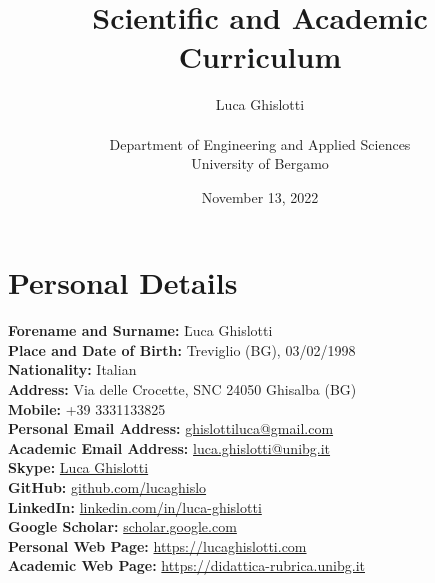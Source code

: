 \documentclass[11pt]{article}
\title{\huge Scientific and Academic Curriculum%
}
\author{\vspace{0.2cm}\begin{huge}Luca Ghislotti\end{huge}\\\vspace{0.1cm} Department of Engineering and Applied Sciences\\University of Bergamo}
\date{November 13, 2022}
\begin{document}
\maketitle
\thispagestyle{fancy}

\onehalfspacing

\section*{Personal Details}
\begin{tabbing}
\hspace{8pt}\textbf{Forename and Surname: } \= Luca Ghislotti\\
\hspace{6pt}\textbf{Place and Date of Birth: } \> Treviglio (BG), 03/02/1998\\
\hspace{76.5pt}\textbf{Nationality: } \>Italian\\
\hspace{94pt}\textbf{Address: } Via delle Crocette, SNC 24050 Ghisalba (BG)\\
\hspace{100.5pt}\textbf{Mobile: } +39 3331133825\\
\hspace{6.5pt}\textbf{Personal Email Address: } \href{mailto:ghislottiluca@gmail.com}{ghislottiluca@gmail.com}\\
\hspace{0pt}\textbf{Academic Email Address: } \href{mailto:l.ghislotti@studenti.unibg.it}{luca.ghislotti@unibg.it}\\
\hspace{105pt}\textbf{Skype: } \href{https://join.skype.com/invite/m1XvXqe82tbO}{Luca Ghislotti}\\
\hspace{96.5pt}\textbf{GitHub: } \href{https://github.com/lucaghislo}{github.com/lucaghislo}\\
\hspace{89.5pt}\textbf{LinkedIn: } \href{https://www.linkedin.com/in/luca-ghislotti/}{linkedin.com/in/luca-ghislotti}\\
\hspace{55.5pt}\textbf{Google Scholar: } \href{https://scholar.google.com/citations?user=Xt1\_bCYAAAAJ}{scholar.google.com}\\
\hspace{31.5pt}\textbf{Personal Web Page: } \href{https://lucaghislotti.com}{https://lucaghislotti.com}\\
\hspace{25pt}\textbf{Academic Web Page: } \href{https://didattica-rubrica.unibg.it/ugov/person/135728}{https://didattica-rubrica.unibg.it} 
\end{tabbing}
\end{document}
